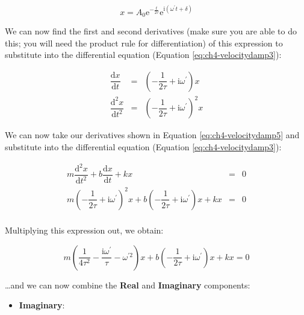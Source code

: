 \documentclass[
]{book}
\providecommand{\tightlist}{%
  \setlength{\itemsep}{0pt}\setlength{\parskip}{0pt}}
\begin{document}
\begin{equation}
x = A_0 \mathrm{e}^{-\frac{t}{2\tau}} \mathrm{e}^{\mathrm{i}(\omega^\prime t + \delta)}
\label{eq:ch4-velocitydamp4}
\end{equation}

We can now find the first and second derivatives (make sure you are able to do this; you will need the product rule for differentiation) of this expression to substitute into the differential equation (Equation \eqref{eq:ch4-velocitydamp3}):

\begin{equation}
\begin{array}{rcl}
\dfrac{\mathrm{d}x}{\mathrm{d}t} &=& \left( -\dfrac{1}{2\tau} + \mathrm{i}\omega^\prime \right) x\\
\dfrac{\mathrm{d}^2x}{\mathrm{d}t^2} &=& \left( -\dfrac{1}{2\tau} + \mathrm{i}\omega^\prime \right)^2 x
\end{array}
\label{eq:ch4-velocitydamp5}
\end{equation}

We can now take our derivatives shown in Equation \eqref{eq:ch4-velocitydamp5} and substitute into the differential equation (Equation \eqref{eq:ch4-velocitydamp3}):

\begin{equation}
\begin{array}{rcl}
m \dfrac{\mathrm{d}^2 x}{\mathrm{d}t^2} + b \dfrac{\mathrm{d}x}{\mathrm{d}t}+ kx &=&0\\
m \left( -\dfrac{1}{2\tau} + \mathrm{i}\omega^\prime \right)^2 x + b \left( -\dfrac{1}{2\tau} + \mathrm{i}\omega^\prime \right) x + kx &=& 0 \\
\end{array}
\label{eq:ch4-velocitydamp6}
\end{equation}

Multiplying this expression out, we obtain:

\begin{equation}
m \left( \frac{1}{4\tau^2} - \frac{\mathrm{i}\omega^\prime}{\tau} - \omega ^{\prime 2} \right) x + b \left( -\frac{1}{2\tau} + \mathrm{i}\omega^\prime \right) x + kx = 0
\end{equation}

\ldots and we can now combine the \textbf{Real} and \textbf{Imaginary} components:

\begin{itemize}
\tightlist
\item
  \textbf{Imaginary}:
\end{itemize}
\end{document}
